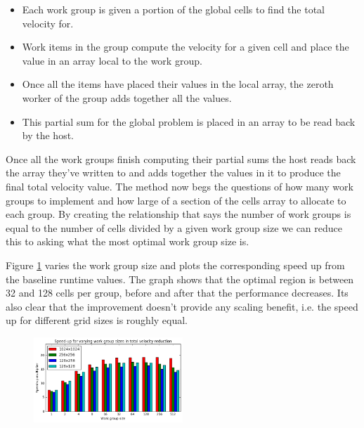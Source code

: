 \documentclass[12pt, a4paper]{article}
\begin{document}
  \vspace{-.5cm}
  \begin{itemize}
    \setlength\itemsep{0.0cm}
    \item [(1)] Each work group is given a portion of the global cells to find the total velocity for.
    \item [(2)] Work items in the group compute the velocity for a given cell and place the value in an array local to the work group.
    \item [(3)] Once all the items have placed their values in the local array, the zeroth worker of the group adds together all the values.
    \item [(4)] This partial sum for the global problem is placed in an array to be read back by the host.
  \end{itemize}

  \begin{multicols}{2}

    Once all the work groups finish computing their partial sums the host reads back the array they've written to and adds together the values in it to produce the final total velocity value. The method now begs the questions of how many work groups to implement and how large of a section of the cells array to allocate to each group. By creating the relationship that says the number of work groups is equal to the number of cells divided by a given work group size we can reduce this to asking what the most optimal work group size is.

    Figure \ref{wgs} varies the work group size and plots the corresponding speed up from the baseline runtime values. The graph shows that the optimal region is between 32 and 128 cells per group, before and after that the performance decreases. Its also clear that the improvement doesn't provide any scaling benefit, i.e. the speed up for different grid sizes is roughly equal.

    \begin{figure}[H]
      \caption{} \label{wgs}
      \vspace{-0.8cm}
      \begin{center}
        \includegraphics[width=0.5\textwidth]{figures/workgroupsize}
      \end{center}
    \end{figure}


  \end{multicols}
\end{document}
